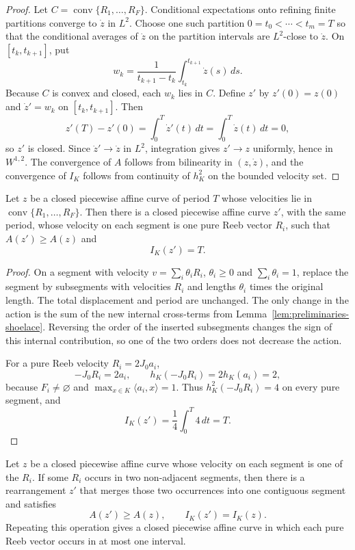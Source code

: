 \begin{proof}
Let \(C=\operatorname{conv}\{R_1,\ldots,R_F\}\). Conditional expectations onto
refining finite partitions converge to \(\dot z\) in \(L^2\). Choose one such
partition \(0=t_0<\cdots<t_m=T\) so that the conditional averages of
\(\dot z\) on the partition intervals are \(L^2\)-close to \(\dot z\). On
\([t_k,t_{k+1}]\), put
\[
  w_k=\frac{1}{t_{k+1}-t_k}\int_{t_k}^{t_{k+1}}\dot z(s)\,ds.
\]
Because \(C\) is convex and closed, each \(w_k\) lies in \(C\). Define \(z'\)
by \(z'(0)=z(0)\) and \(\dot z'=w_k\) on \([t_k,t_{k+1}]\). Then
\[
  z'(T)-z'(0)=\int_0^T\dot z'(t)\,dt=\int_0^T\dot z(t)\,dt=0,
\]
so \(z'\) is closed. Since \(\dot z'\to\dot z\) in \(L^2\), integration gives
\(z'\to z\) uniformly, hence in \(W^{1,2}\). The convergence of \(A\) follows
from bilinearity in \((z,\dot z)\), and the convergence of \(I_K\) follows
from continuity of \(h_K^2\) on the bounded velocity set.
\end{proof}

\begin{lemma}\label{lem:generalized-reeb-splitting}
Let \(z\) be a closed piecewise affine curve of period \(T\) whose velocities
lie in \(\operatorname{conv}\{R_1,\ldots,R_F\}\). Then there is a closed
piecewise affine curve \(z'\), with the same period, whose velocity on each
segment is one pure Reeb vector \(R_i\), such that \(A(z')\geq A(z)\) and
\[
  I_K(z')=T.
\]
\end{lemma}

\begin{proof}
On a segment with velocity \(v=\sum_i\theta_iR_i\), \(\theta_i\ge0\) and
\(\sum_i\theta_i=1\), replace the segment by subsegments with velocities
\(R_i\) and lengths \(\theta_i\) times the original length. The total
displacement and period are unchanged. The only change in the action is the
sum of the new internal cross-terms from
Lemma~\ref{lem:preliminaries-shoelace}. Reversing the order of the inserted
subsegments changes the sign of this internal contribution, so one of the two
orders does not decrease the action.

For a pure Reeb velocity \(R_i=2J_0a_i\),
\[
  -J_0R_i=2a_i,
  \qquad
  h_K(-J_0R_i)=2h_K(a_i)=2,
\]
because \(F_i\neq\varnothing\) and \(\max_{x\in K}\langle a_i,x\rangle=1\).
Thus \(h_K^2(-J_0R_i)=4\) on every pure segment, and
\[
  I_K(z')=\frac14\int_0^T4\,dt=T.
\]
\end{proof}

\begin{lemma}\label{lem:generalized-reeb-merging}
Let \(z\) be a closed piecewise affine curve whose velocity on each segment is
one of the \(R_i\). If some \(R_i\) occurs in two non-adjacent segments, then
there is a rearrangement \(z'\) that merges those two occurrences into one
contiguous segment and satisfies
\[
  A(z')\geq A(z),
  \qquad
  I_K(z')=I_K(z).
\]
Repeating this operation gives a closed piecewise affine curve in which each
pure Reeb vector occurs in at most one interval.
\end{lemma}

